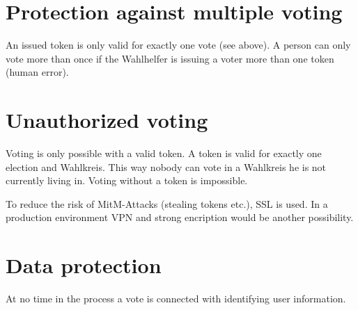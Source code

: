 \documentclass[10pt,a4paper]{article}
\begin{document}
\section*{Protection against multiple voting}
An issued token is only valid for exactly one vote (see above). A person can only vote more than once if the Wahlhelfer is issuing a voter more than one token (human error).

\section*{Unauthorized voting}
Voting is only possible with a valid token. A token is valid for exactly one election and Wahlkreis. This way nobody can vote in a Wahlkreis he is not currently living in. Voting without a token is impossible. 

To reduce the risk of MitM-Attacks (stealing tokens etc.), SSL is used. In a production environment VPN and strong encription would be another possibility.

\section*{Data protection}
At no time in the process a vote is connected with identifying user information. 
\end{document}
